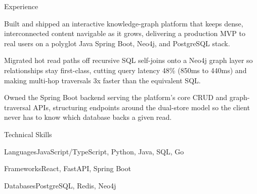 \documentclass[
	11pt
]{../../../template}
\begin{document}
\begin{rSection}{E}{xperience}
\begin{rSectionEntry}
			\item Built and shipped an interactive knowledge-graph platform that keeps dense, interconnected content navigable as it grows, delivering a production MVP to real users on a polyglot Java Spring Boot, Neo4j, and PostgreSQL stack.
			\item Migrated hot read paths off recursive SQL self-joins onto a Neo4j graph layer so relationships stay first-class, cutting query latency 48\% (850ms to 440ms) and making multi-hop traversals 3x faster than the equivalent SQL.
			\item Owned the Spring Boot backend serving the platform's core CRUD and graph-traversal APIs, structuring endpoints around the dual-store model so the client never has to know which database backs a given read.
		\end{rSectionEntry}
	\end{rSection}

	\begin{rSection}{T}{echnical Skills}
		\begin{rSet}{Languages}{JavaScript/TypeScript, Python, Java, SQL, Go}
		\end{rSet}
		\begin{rSet}{Frameworks}{React, FastAPI, Spring Boot}
		\end{rSet}
		\begin{rSet}{Databases}{PostgreSQL, Redis, Neo4j}
		\end{rSet}
	\end{rSection}
\end{document}
